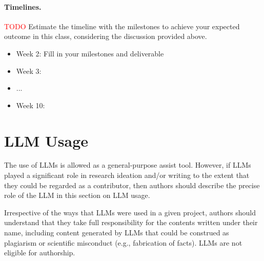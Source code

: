 \documentclass{article}
\begin{document}
\paragraph{Timelines.}
\textcolor{red}{TODO} Estimate the timeline with the milestones to achieve your expected outcome in this class, considering the discussion provided above.
\begin{itemize}
    \item Week 2: Fill in your milestones and deliverable
    \item Week 3:
    \item ...
    \item Week 10:
\end{itemize}


\section*{LLM Usage}
The use of LLMs is allowed as a general-purpose assist tool. However,  if LLMs played a significant role in research ideation and/or writing to the extent that they could be regarded as a contributor, then authors should describe the precise role of the LLM in this section on LLM usage. 

Irrespective of the ways that LLMs were used in a given project, authors should understand that they take full responsibility for the contents written under their name, including content generated by LLMs that could be construed as plagiarism or scientific misconduct (e.g., fabrication of facts).  LLMs are not eligible for authorship.




% 
% 
\end{document}
